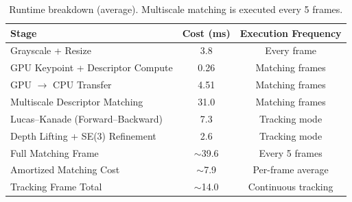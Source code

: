 \begin{table}[htbp]
\centering
\caption{Runtime breakdown (average). Multiscale matching is executed every 5 frames.}
\label{tab:runtime_breakdown}
\begin{tabular}{lcc}
\toprule
\textbf{Stage} & \textbf{Cost (ms)} & \textbf{Execution Frequency} \\
\midrule
Grayscale + Resize                  & 3.8   & Every frame \\
GPU Keypoint + Descriptor Compute   & 0.26  & Matching frames \\
GPU $\rightarrow$ CPU Transfer      & 4.51  & Matching frames \\
Multiscale Descriptor Matching      & 31.0  & Matching frames \\
Lucas--Kanade (Forward--Backward)   & 7.3   & Tracking mode \\
Depth Lifting + SE(3) Refinement    & 2.6   & Tracking mode \\
\midrule
Full Matching Frame                 & $\sim$39.6 & Every 5 frames \\
Amortized Matching Cost             & $\sim$7.9  & Per-frame average \\
Tracking Frame Total                & $\sim$14.0 & Continuous tracking \\
\bottomrule
\end{tabular}
\end{table}
